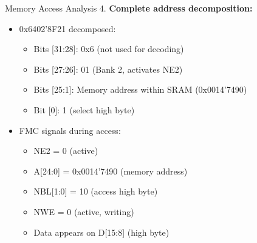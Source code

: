 \begin{example2}{Memory Access Analysis}
4. \textbf{Complete address decomposition:}
   \begin{itemize}
     \item 0x6402'8F21 decomposed:
     \begin{itemize}
       \item Bits [31:28]: 0x6 (not used for decoding)
       \item Bits [27:26]: 01 (Bank 2, activates NE2)
       \item Bits [25:1]: Memory address within SRAM (0x0014'7490)
       \item Bit [0]: 1 (select high byte)
     \end{itemize}
     \item FMC signals during access:
     \begin{itemize}
       \item NE2 = 0 (active)
       \item A[24:0] = 0x0014'7490 (memory address)
       \item NBL[1:0] = 10 (access high byte)
       \item NWE = 0 (active, writing)
       \item Data appears on D[15:8] (high byte)
     \end{itemize}
   \end{itemize}
\end{example2}